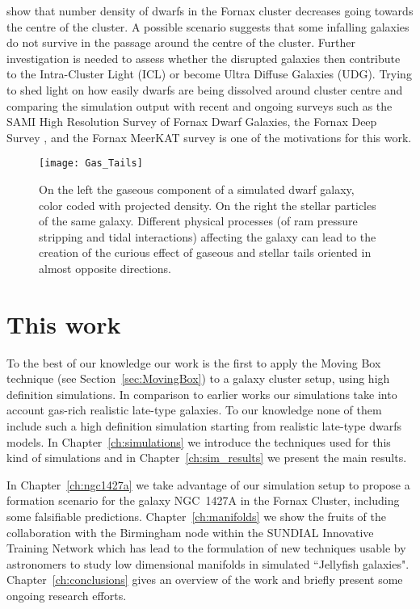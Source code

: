 \citet{Venhola2018} show that number density of dwarfs in the Fornax cluster decreases going towards the centre of the cluster.
A possible scenario suggests that some infalling galaxies do not survive in the passage around the centre of the cluster.
Further investigation is needed to assess  whether the disrupted galaxies then contribute to the Intra-Cluster Light (ICL) or become Ultra Diffuse Galaxies (UDG).
Trying to shed light on how easily dwarfs are being dissolved around cluster centre and comparing the simulation output with recent and ongoing surveys such as the SAMI High Resolution Survey of Fornax Dwarf Galaxies, \citep{Owers2019, Scott2018}
the Fornax Deep Survey \citep{Venhola2018}, and the Fornax MeerKAT survey \citep{Loni2021} is one of the motivations for this work.



\begin{figure}
  \centering
  \texttt{[image: Gas\_Tails]}
  \caption{On the left the gaseous component of a simulated dwarf galaxy, color coded with projected density.
    On the right the stellar particles of the same galaxy.
   Different physical processes (of ram pressure stripping and tidal interactions) affecting the galaxy can lead to the creation of the curious effect of gaseous and stellar tails oriented in almost opposite directions.}
  \label{fig:tails}
\end{figure}


\section{This work}
To the best of our knowledge our work is the first to apply the Moving Box technique (see Section~\ref{sec:MovingBox}) to a galaxy cluster setup, using high definition simulations.
In comparison to earlier works our simulations take into account gas-rich realistic late-type galaxies.
To our knowledge none of them include such a high definition simulation starting from realistic late-type dwarfs models.
In Chapter~\ref{ch:simulations} we introduce the techniques used for this kind of simulations and in Chapter~\ref{ch:sim_results} we present the main results.

In Chapter~\ref{ch:ngc1427a} \citep{Mastropietro2021} we take advantage of our simulation setup to propose a formation scenario for the galaxy NGC~1427A in the Fornax Cluster, including some falsifiable predictions.
Chapter~\ref{ch:manifolds} \citep{Canducci2021} we show the fruits of the collaboration with the Birmingham node within the SUNDIAL Innovative Training Network which has lead to the formulation of new techniques usable by astronomers to study low dimensional manifolds in simulated ``Jellyfish galaxies".
Chapter~\ref{ch:conclusions} gives an overview of the work and briefly present some ongoing research efforts.


